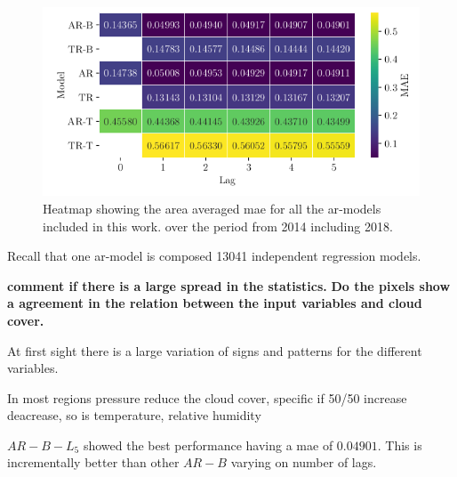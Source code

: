 \begin{figure}
    \centering
    \includegraphics{python_figs/heat_ar_model_mae_test_score.png}
    \caption{Heatmap showing the area averaged \acrshort{mae} for all the \acrshort{ar}-models included in this work. over the period from 2014 including 2018.}
    \label{fig:heatmap_ar_models}
\end{figure}

Recall that one \acrshort{ar}-model is composed 13041 independent regression models.

\textbf{comment if there is a large spread in the statistics.} \textbf{Do the pixels show a agreement in the relation between the input variables and cloud cover.}

At first sight there is a large variation of signs and patterns for the different variables. 

In most regions pressure reduce the cloud cover, specific if 50/50 increase deacrease, so is temperature, relative humidity 

$AR-B-L_5$ showed the best performance having a \acrshort{mae} of $0.04901$. This is incrementally better than other $AR-B$ varying on number of lags. 

